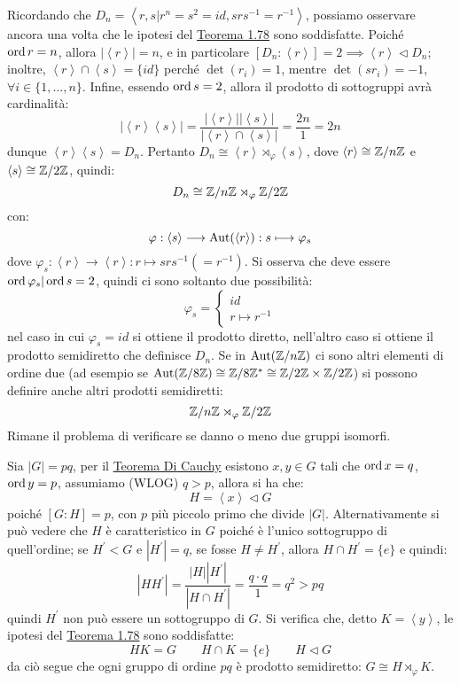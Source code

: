 \documentclass[11pt]{scrartcl}
\begin{document}
\begin{example}
    Ricordando che $D_n = \left<r,s | r^n = s^2 = id, srs^{-1} = r^{-1}\right>$, possiamo osservare ancora una volta che le ipotesi del \hyperref[t:1.78]{Teorema 1.78} sono soddisfatte. Poiché $\operatorname{ord} r = n$, allora $|\left<r\right>| = n$, 
    e in particolare $[D_n : \left<r\right>] = 2 \implies \left<r\right> \triangleleft D_n$; inoltre, $\left<r\right> \cap \left<s\right> = \{id\}$ perché $\det(r_i) = 1$, mentre $\det(sr_i) = -1$, $\forall i \in \{1,\ldots,n\}$. Infine, essendo $\operatorname{ord} s = 2$, allora il prodotto di sottogruppi avrà cardinalità:
        \[ |\left<r\right>\left<s\right>| = \frac{|\left<r\right>||\left<s\right>|}{|\left<r\right> \cap \left<s\right>|} = \frac{2n}{1} = 2n
            \]
    dunque $\left<r\right>\left<s\right> = D_n$. Pertanto $D_n \cong \left<r\right> \rtimes_{\varphi} \left<s\right>$, dove $\left<r\right> \cong {\mathbb Z}/n{\mathbb Z}$ e $\left<s\right> \cong \mathbb{Z}/{2}\mathbb{Z}$, quindi:
        \[ D_n \cong {\mathbb Z}/n{\mathbb Z} \rtimes_{\varphi} \mathbb{Z}/{2}\mathbb{Z}
            \]
    con:
        \[ \varphi : \left<s\right> \longrightarrow \operatorname{Aut}(\left<r\right>) : s \longmapsto \varphi_s
            \]
    dove $\varphi_s : \left<r\right> \longrightarrow \left<r\right> : r \longmapsto srs^{-1} (= r^{-1})$. Si osserva che deve essere $\operatorname{ord} \varphi_s | \operatorname{ord} s = 2$, quindi ci sono soltanto due possibilità:
        \[ \varphi_s = \begin{cases}
            id \\
            r \longmapsto r^{-1}
            \end{cases}
        \]
    nel caso in cui $\varphi_s = id$ si ottiene il prodotto diretto, nell'altro caso si ottiene il prodotto semidiretto che definisce $D_n$. Se in $\operatorname{Aut}({\mathbb Z}/n{\mathbb Z})$ ci sono altri elementi di ordine due
     (ad esempio se $\operatorname{Aut}(\mathbb{Z}/{8}\mathbb{Z}) \cong \mathbb{Z}/{8}\mathbb{Z}^* \cong \mathbb{Z}/{2}\mathbb{Z} \times \mathbb{Z}/{2}\mathbb{Z}$) si possono definire anche altri prodotti semidiretti:
    \[ {\mathbb Z}/n{\mathbb Z} \rtimes_{\varphi} \mathbb{Z}/{2}\mathbb{Z}
        \]
    Rimane il problema di verificare se danno o meno due gruppi isomorfi.
\end{example}

\begin{example}
    Sia $|G| = pq$, per il \hyperref[p:Cauchy]{Teorema Di Cauchy} esistono $x,y \in G$ tali che $\operatorname{ord} x = q$, $\operatorname{ord} y = p$, assumiamo (WLOG) $q>p$, allora si ha che:
        \[ H = \left<x\right> \triangleleft G
            \]
    poiché $[G : H] = p$, con $p$ più piccolo primo che divide $|G|$. Alternativamente si può vedere che $H$ è caratteristico in $G$ poiché è l'unico sottogruppo di quell'ordine;
    se $H^{\prime} < G$ e $|H^{\prime}| = q$, se fosse $H \ne H^{\prime}$, allora $H \cap H^{\prime} = \{e\}$ e quindi:
    \[ |HH^{\prime}| = \frac{|H||H^{\prime}|}{|H \cap H^{\prime}|} = \frac{q \cdot q}{1} = q^2 > pq
        \]
    quindi $H^{\prime}$ non può essere un sottogruppo di $G$. Si verifica che, detto $K = \left<y\right>$, le ipotesi del \hyperref[t:1.78]{Teorema 1.78} sono soddisfatte:
        \[ HK = G \qquad H \cap K = \{e\} \qquad H \triangleleft G
            \]
da ciò segue che ogni gruppo di ordine $pq$ è prodotto semidiretto: $G \cong H \rtimes_{\varphi} K$.
\end{example}
\end{document}
